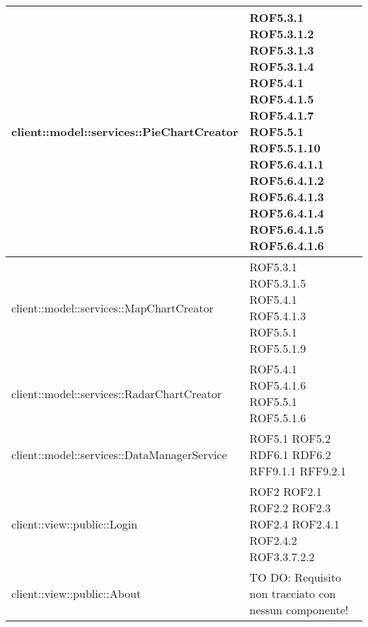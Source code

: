 \begin{center}
\begin{longtable}{| p{11cm} | p{2.5cm} |}
\hline
client::model::services::PieChartCreator & ROF5.3.1 \newline ROF5.3.1.2 \newline ROF5.3.1.3 \newline ROF5.3.1.4 \newline ROF5.4.1 \newline ROF5.4.1.5 \newline ROF5.4.1.7 \newline ROF5.5.1 \newline ROF5.5.1.10 \newline ROF5.6.4.1.1 \newline ROF5.6.4.1.2 \newline ROF5.6.4.1.3 \newline ROF5.6.4.1.4 \newline ROF5.6.4.1.5 \newline ROF5.6.4.1.6 \\
\hline
client::model::services::MapChartCreator & ROF5.3.1 \newline ROF5.3.1.5 \newline ROF5.4.1 \newline ROF5.4.1.3 \newline ROF5.5.1 \newline ROF5.5.1.9 \\
\hline
client::model::services::RadarChartCreator & ROF5.4.1 \newline ROF5.4.1.6 \newline ROF5.5.1 \newline ROF5.5.1.6 \\
\hline
client::model::services::DataManagerService & ROF5.1 \newline ROF5.2 \newline RDF6.1 \newline RDF6.2 \newline RFF9.1.1 \newline RFF9.2.1 \\
\hline
client::view::public::Login & ROF2 \newline ROF2.1 \newline ROF2.2 \newline ROF2.3 \newline ROF2.4 \newline ROF2.4.1 \newline ROF2.4.2 \newline ROF3.3.7.2.2 \\
\hline
client::view::public::About & TO DO: Requisito non tracciato con nessun componente! \\

\end{longtable}
\end{center}
